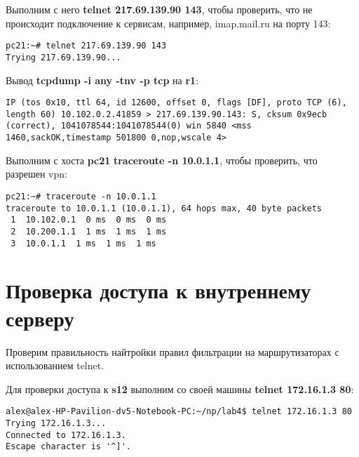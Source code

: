 \documentclass[a4paper,12pt]{article}
\begin{document}
Выполним с него \textbf{telnet 217.69.139.90 143},  чтобы проверить, что не
происходит подключение к сервисам, например, imap.mail.ru на порту 143:
\begin{Verbatim}
pc21:~# telnet 217.69.139.90 143
Trying 217.69.139.90...
\end{Verbatim}

Вывод \textbf{tcpdump -i any -tnv -p tcp} на \textbf{r1}:
\begin{Verbatim}
IP (tos 0x10, ttl 64, id 12600, offset 0, flags [DF], proto TCP (6), length 60) 10.102.0.2.41859 > 217.69.139.90.143: S, cksum 0x9ecb (correct), 1041078544:1041078544(0) win 5840 <mss 1460,sackOK,timestamp 501800 0,nop,wscale 4>
\end{Verbatim}

Выполним с хоста \textbf{pc21} \textbf{traceroute -n 10.0.1.1},  чтобы проверить,
что разрешен vpn:
\begin{Verbatim}
pc21:~# traceroute -n 10.0.1.1
traceroute to 10.0.1.1 (10.0.1.1), 64 hops max, 40 byte packets
 1  10.102.0.1  0 ms  0 ms  0 ms
 2  10.200.1.1  1 ms  1 ms  1 ms
 3  10.0.1.1  1 ms  1 ms  1 ms
\end{Verbatim}


\section{Проверка доступа к внутреннему серверу}

Проверим правильность найтройки правил фильтрации на маршрутизаторах
с использованием  telnet.

Для проверки доступа к \textbf{s12} выполним со своей машины
\textbf{telnet 172.16.1.3 80}:
\begin{Verbatim}
alex@alex-HP-Pavilion-dv5-Notebook-PC:~/np/lab4$ telnet 172.16.1.3 80
Trying 172.16.1.3...
Connected to 172.16.1.3.
Escape character is '^]'.
\end{Verbatim}
\end{document}
